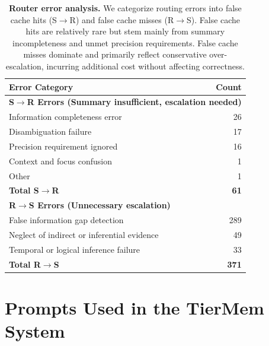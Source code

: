 \documentclass{article}
\theoremstyle{plain}
\theoremstyle{definition}
\theoremstyle{remark}
\begin{document}
\begin{table}[!t]
\centering
\small
\setlength{\tabcolsep}{6pt}
\begin{tabular}{l r}
\toprule
\textbf{Error Category} & \textbf{Count} \\
\midrule
\multicolumn{2}{l}{\textbf{S$\rightarrow$R Errors (Summary insufficient, escalation needed)}} \\
\midrule
Information completeness error & 26 \\
Disambiguation failure & 17 \\
Precision requirement ignored & 16 \\
Context and focus confusion & 1 \\
Other & 1 \\
\midrule
\textbf{Total S$\rightarrow$R} & \textbf{61} \\
\midrule\midrule
\multicolumn{2}{l}{\textbf{R$\rightarrow$S Errors (Unnecessary escalation)}} \\
\midrule
False information gap detection & 289 \\
Neglect of indirect or inferential evidence & 49 \\
Temporal or logical inference failure & 33 \\
\midrule
\textbf{Total R$\rightarrow$S} & \textbf{371} \\
\bottomrule
\end{tabular}
\caption{\textbf{Router error analysis.}
We categorize routing errors into false cache hits (S$\rightarrow$R) and false cache misses (R$\rightarrow$S).
False cache hits are relatively rare but stem mainly from summary incompleteness and unmet precision requirements.
False cache misses dominate and primarily reflect conservative over-escalation, incurring additional cost without affecting correctness.}
\label{tab:router_error_analysis}
\end{table}


\section{Prompts Used in the TierMem System}
\label{app:prompts}
\end{document}
